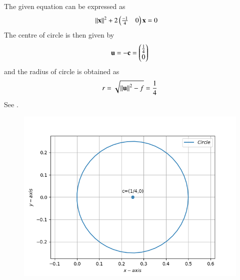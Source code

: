 The given equation can be expressed as 
\begin{align}
\left\lVert\mathbf{x}\right\rVert^2+2\begin{pmatrix}\frac{-1}{4} & 0\end{pmatrix}\mathbf{x}&=0
\end{align}	
The centre of circle is then given by 
\begin{align}
	\mathbf{u} = -\mathbf{c} 
=\begin{pmatrix}\frac{1}{4}\\0\end{pmatrix}
\end{align}
and the radius of circle is obtained as
\begin{align}
	r=\sqrt{\left\lVert\mathbf{u}\right\rVert^2 -f}
=\frac{1}{4}
\end{align}
See 
  .
\begin{figure}[h]
\includegraphics[width=\columnwidth]{chapters/11/11/1/9/figs/fig.png}
\caption{}
  \label{fig:chapters/11/11/1/9/Figure}
\end{figure}

